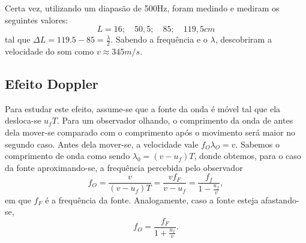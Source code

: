\documentclass[PhysicsII/physicsII_notes.tex]{subfiles}
\begin{document}
Certa vez, utilizando um diapasão de 500Hz, foram medindo e mediram os seguintes valores:
\[
	L = 16;\quad50,5;\quad85;\quad119,5cm
\]
tal que \(\Delta L = 119.5 - 85 = \frac{\lambda }{2}\). Sabendo a frequência e o \(\lambda \), descobriram a velocidade do som como \(v\approx 345m/s.\)
\subsection{Efeito Doppler}
Para estudar este efeito, assume-se que a fonte da onda é móvel tal que ela desloca-se \(u_{f}T\). Para um observador olhando, o comprimento da onda de antes dela
mover-se comparado com o comprimento após o movimento será maior no segundo caso. Antes dela mover-se, a velocidade vale \(f_{O}\lambda_{O} = v\).
Sabemos o comprimento de onda como sendo \(\lambda_{0} = (v-u_{f})T\), donde obtemos, para o caso da fonte aproximando-se, a frequência percebida pelo observador
\[
	f_{O} = \frac{v}{(v-u_{f})T} = \frac{vf_{F}}{v-u_{f}} = \frac{f_{f}}{1-\frac{u_{f}}{v}},
\]
em que \(f_{F}\) é a frequência da fonte. Analogamente, caso a fonte esteja afastando-se,
\[
	f_{O} = \frac{f_{F}}{1+\frac{u_{f}}{v}}.
\]
\end{document}
